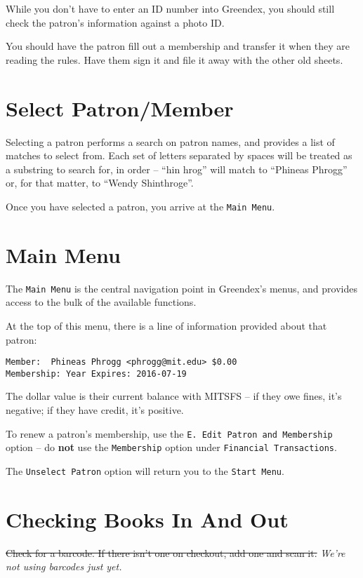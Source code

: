 \documentclass[12pt]{article}
\begin{document}
While you don't have to enter an ID number into Greendex, you should
still check the patron's information against a photo ID.

You should have the patron fill out a membership and transfer it when
they are reading the rules. Have them sign it and file it away with
the other old sheets.

\section{Select Patron/Member}

Selecting a patron performs a search on patron names, and provides a
list of matches to select from.  Each set of letters separated by spaces
will be treated as a substring to search for, in order -- ``hin hrog''
will match to ``Phineas Phrogg'' or, for that matter, to ``Wendy
Shinthroge''.

Once you have selected a patron, you arrive at the \texttt{Main Menu}.

\section{Main Menu}

The \texttt{Main Menu} is the central navigation point in Greendex's menus, and
provides access to the bulk of the available functions.

At the top of this menu, there is a line of information provided
about that patron:

\begin{verbatim}
Member:  Phineas Phrogg <phrogg@mit.edu> $0.00
Membership: Year Expires: 2016-07-19
\end{verbatim}

The dollar value is their current balance with MITSFS -- if they owe
fines, it's negative; if they have credit, it's positive.

To renew a patron's membership, use the \texttt{E. Edit Patron and
  Membership} option -- do \textbf{not} use the \texttt{Membership} option
under \texttt{Financial Transactions}.

The \texttt{Unselect Patron} option will return you to the \texttt{Start
  Menu}.


\section{Checking Books In And Out}

\sout{Check for a barcode. If there isn't one on checkout, add one and scan
it.}  \emph{We're not using barcodes just yet.}
\end{document}
